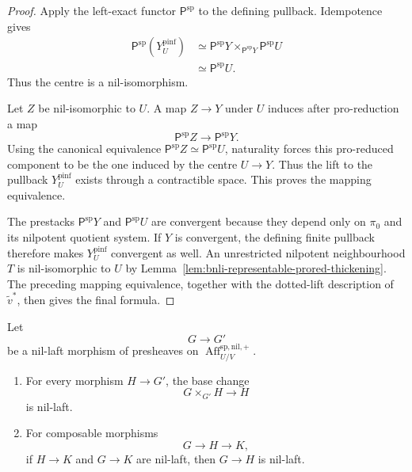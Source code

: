 \begin{proof}
Apply the left-exact functor $\mathsf P^{\mathrm{sp}}$ to the defining
pullback.  Idempotence gives
\[
\begin{aligned}
    \mathsf P^{\mathrm{sp}}
    \left(
      Y_U^{\mathrm{pinf}}
    \right)
    &\simeq
    \mathsf P^{\mathrm{sp}}Y
    \times_{\mathsf P^{\mathrm{sp}}Y}
    \mathsf P^{\mathrm{sp}}U\\
    &\simeq
    \mathsf P^{\mathrm{sp}}U.
\end{aligned}
\]
Thus the centre is a nil-isomorphism.

Let $Z$ be nil-isomorphic to $U$.  A map $Z\to Y$ under $U$ induces after
pro-reduction a map
\[
    \mathsf P^{\mathrm{sp}}Z
    \longrightarrow
    \mathsf P^{\mathrm{sp}}Y.
\]
Using the canonical equivalence
$\mathsf P^{\mathrm{sp}}Z\simeq\mathsf P^{\mathrm{sp}}U$, naturality forces
this pro-reduced component to be the one induced by the centre $U\to Y$.
Thus the lift to the pullback $Y_U^{\mathrm{pinf}}$ exists through a
contractible space.  This proves the mapping equivalence.

The prestacks $\mathsf P^{\mathrm{sp}}Y$ and
$\mathsf P^{\mathrm{sp}}U$ are convergent because they depend only on
$\pi_0$ and its nilpotent quotient system.  If $Y$ is convergent, the defining
finite pullback therefore makes $Y_U^{\mathrm{pinf}}$ convergent as well.
An unrestricted nilpotent neighbourhood $T$ is nil-isomorphic to $U$ by
Lemma~\ref{lem:bnli-representable-prored-thickening}.  The preceding mapping equivalence,
together with the dotted-lift description of $\widetilde v^*$, then gives the
final formula.
\end{proof}

\begin{lemma}
\label{lem:bnli-nil-laft-base-change-cancellation}
Let
\[
    G\longrightarrow G'
\]
be a nil-laft morphism of presheaves on
$\operatorname{Aff}^{\mathrm{sp,nil,+}}_{U/V}$.
\begin{enumerate}
    \item For every morphism $H\to G'$, the base change
    \[
        G\times_{G'}H\longrightarrow H
    \]
    is nil-laft.
    \item For composable morphisms
    \[
        G\longrightarrow H\longrightarrow K,
    \]
    if $H\to K$ and $G\to K$ are nil-laft, then $G\to H$ is nil-laft.
\end{enumerate}
\end{lemma}

